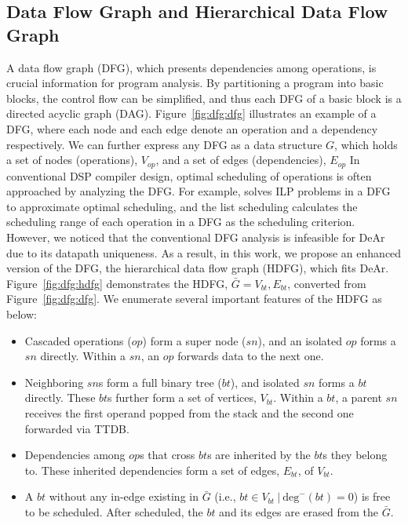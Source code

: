 \subsection{Data Flow Graph and Hierarchical Data Flow Graph}
\label{sec:hdfg}
A data flow graph (DFG), which presents dependencies among operations, is crucial information for program analysis.
By partitioning a program into basic blocks, the control flow can be simplified, and thus each DFG of a basic block is a directed acyclic graph (DAG).
Figure~\ref{fig:dfg:dfg} illustrates an example of a DFG, where each node and each edge denote an operation and a dependency respectively.
We can further express any DFG as a data structure $G$, which holds a set of nodes (operations), $V_{op}$, and a set of edges (dependencies), $E_{op}$
In conventional DSP compiler design, optimal scheduling of operations is often approached by analyzing the DFG.
For example, \cite{dsplite} solves ILP problems \cite{ilp} in a DFG to approximate optimal scheduling, 
and the list scheduling \cite{list} calculates the scheduling range of each operation in a DFG as the scheduling criterion. 
\\\indent
However, we noticed that the conventional DFG analysis is infeasible for DeAr due to its datapath uniqueness.
As a result, in this work, we propose an enhanced version of the DFG, the hierarchical data flow graph (HDFG), which fits DeAr.
Figure~\ref{fig:dfg:hdfg} demonstrates the HDFG, $\bar{G} = {V_{bt}, E_{bt}}$, converted from Figure~\ref{fig:dfg:dfg}.
We enumerate several important features of the HDFG as below: 
\begin{itemize}
    \item Cascaded operations ($op$) form a super node ($sn$), and an isolated $op$ forms a $sn$ directly. 
Within a $sn$, an $op$ forwards data to the next one.
    \item Neighboring $sn$s form a full binary tree ($bt$), and isolated $sn$ forms a $bt$ directly.
These $bt$s further form a set of vertices, $V_{bt}$.
Within a $bt$, a parent $sn$ receives the first operand popped from the stack and the second one forwarded via TTDB.
    \item Dependencies among $op$s that cross $bt$s are inherited by the $bt$s they belong to.
These inherited dependencies form a set of edges, $E_{bt}$, of $V_{bt}$.
    \item A $bt$ without any in-edge existing in $\bar{G}$ (i.e., $bt \in V_{bt}\ |\ \textrm{deg}^-(bt) = 0$) is free to be scheduled. 
After scheduled, the $bt$ and its edges are erased from the $\bar{G}$.%
\end{itemize}

